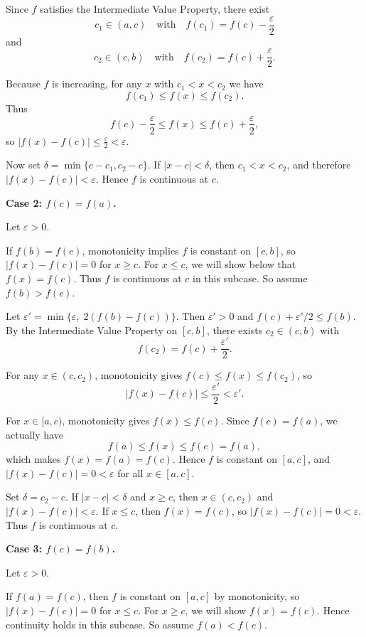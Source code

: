 \documentclass[reqno,11pt]{amsart}
\begin{document}
Since \(f\) satisfies the Intermediate Value Property, there exist
\[
c_1 \in (a,c) \quad \text{with} \quad f(c_1) = f(c) - \frac{\varepsilon}{2}
\]
and
\[
c_2 \in (c,b) \quad \text{with} \quad f(c_2) = f(c) + \frac{\varepsilon}{2}.
\]

Because \(f\) is increasing, for any \(x\) with \(c_1 < x < c_2\) we have
\[
f(c_1) \le f(x) \le f(c_2).
\]
Thus
\[
f(c) - \frac{\varepsilon}{2} \le f(x) \le f(c) + \frac{\varepsilon}{2},
\]
so \(|f(x) - f(c)| \le \frac{\varepsilon}{2} < \varepsilon\).

Now set \(\delta = \min\{c - c_1, c_2 - c\}\). If \(|x - c| < \delta\), then \(c_1 < x < c_2\), and therefore \(|f(x) - f(c)| < \varepsilon\). Hence \(f\) is continuous at \(c\).

\medskip
\noindent\textbf{Case 2: \(f(c) = f(a)\).}

Let \(\varepsilon > 0\).

If \(f(b) = f(c)\), monotonicity implies \(f\) is constant on \([c,b]\), so \(|f(x)-f(c)| = 0\) for \(x \ge c\). For \(x \le c\), we will show below that \(f(x) = f(c)\). Thus \(f\) is continuous at \(c\) in this subcase. So assume \(f(b) > f(c)\).

Let \(\varepsilon' = \min\{\varepsilon,\; 2(f(b)-f(c))\}\). Then \(\varepsilon'>0\) and \(f(c)+\varepsilon'/2 \le f(b)\). By the Intermediate Value Property on \([c,b]\), there exists \(c_2 \in (c,b)\) with
\[
f(c_2) = f(c) + \frac{\varepsilon'}{2}.
\]

For any \(x \in (c, c_2)\), monotonicity gives \(f(c) \le f(x) \le f(c_2)\), so
\[
|f(x) - f(c)| \le \frac{\varepsilon'}{2} < \varepsilon'.
\]

For \(x \in [a,c)\), monotonicity gives \(f(x) \le f(c)\). Since \(f(c) = f(a)\), we actually have
\[
f(a) \le f(x) \le f(c) = f(a),
\]
which makes \(f(x) = f(a) = f(c)\). Hence \(f\) is constant on \([a,c]\), and \(|f(x)-f(c)| = 0 < \varepsilon\) for all \(x \in [a,c]\).

Set \(\delta = c_2 - c\). If \(|x - c| < \delta\) and \(x \ge c\), then \(x \in (c, c_2)\) and \(|f(x)-f(c)| < \varepsilon\). If \(x \le c\), then \(f(x) = f(c)\), so \(|f(x)-f(c)| = 0 < \varepsilon\). Thus \(f\) is continuous at \(c\).

\medskip
\noindent\textbf{Case 3: \(f(c) = f(b)\).}

Let \(\varepsilon > 0\).

If \(f(a) = f(c)\), then \(f\) is constant on \([a,c]\) by monotonicity, so \(|f(x)-f(c)| = 0\) for \(x \le c\). For \(x \ge c\), we will show \(f(x) = f(c)\). Hence continuity holds in this subcase. So assume \(f(a) < f(c)\).
\end{document}
